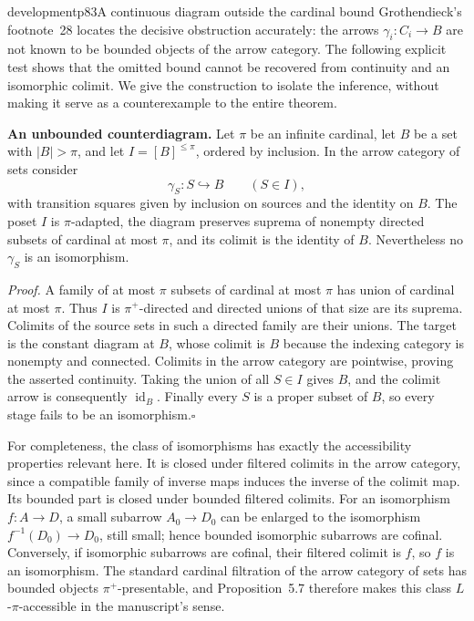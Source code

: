 \begin{dcomment}{development}{p83}{A continuous diagram outside the cardinal bound}
Grothendieck's footnote~28 locates the decisive obstruction accurately: the arrows $\gamma_i:C_i\to B$ are not known to be bounded objects of the arrow category. The following explicit test shows that the omitted bound cannot be recovered from continuity and an isomorphic colimit. We give the construction to isolate the inference, without making it serve as a counterexample to the entire theorem.

\textbf{An unbounded counterdiagram.}\ours
Let $\pi$ be an infinite cardinal, let $B$ be a set with $|B|>\pi$, and let $I=[B]^{\leq\pi}$, ordered by inclusion. In the arrow category of sets consider
\[
 \gamma_S:S\hookrightarrow B\qquad(S\in I),
\]
with transition squares given by inclusion on sources and the identity on $B$. The poset $I$ is $\pi$-adapted, the diagram preserves suprema of nonempty directed subsets of cardinal at most $\pi$, and its colimit is the identity of $B$. Nevertheless no $\gamma_S$ is an isomorphism.

\emph{Proof.} A family of at most $\pi$ subsets of cardinal at most $\pi$ has union of cardinal at most $\pi$. Thus $I$ is $\pi^+$-directed and directed unions of that size are its suprema. Colimits of the source sets in such a directed family are their unions. The target is the constant diagram at $B$, whose colimit is $B$ because the indexing category is nonempty and connected. Colimits in the arrow category are pointwise, proving the asserted continuity. Taking the union of all $S\in I$ gives $B$, and the colimit arrow is consequently $\operatorname{id}_B$. Finally every $S$ is a proper subset of $B$, so every stage fails to be an isomorphism.\hfill$\square$

For completeness, the class of isomorphisms has exactly the accessibility properties relevant here. It is closed under filtered colimits in the arrow category, since a compatible family of inverse maps induces the inverse of the colimit map. Its bounded part is closed under bounded filtered colimits. For an isomorphism $f:A\to D$, a small subarrow $A_0\to D_0$ can be enlarged to the isomorphism $f^{-1}(D_0)\to D_0$, still small; hence bounded isomorphic subarrows are cofinal. Conversely, if isomorphic subarrows are cofinal, their filtered colimit is $f$, so $f$ is an isomorphism. The standard cardinal filtration of the arrow category of sets has bounded objects $\pi^+$-presentable, and Proposition~5.7 therefore makes this class $L$-$\pi$-accessible in the manuscript's sense.


\end{dcomment}
